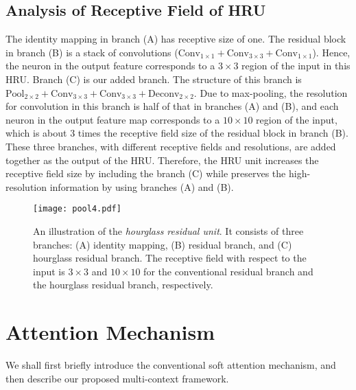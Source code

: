 \documentclass[10pt,twocolumn,letterpaper]{article}
\begin{document}
\subsection{Analysis of Receptive Field of HRU}
The identity mapping in branch (A) has receptive size of one.
The residual block in branch (B) is a stack of convolutions ($\text{Conv}_{1\times1} + \text{Conv}_{3\times3} + \text{Conv}_{1\times1}$).
Hence, the neuron in the output feature corresponds to a $3 \times 3$ region of the input in this HRU. 
Branch (C) is our added branch. The structure of this branch is $\text{Pool}_{2\times 2} + \text{Conv}_{3\times3} + \text{Conv}_{3\times3} + \text{Deconv}_{2\times2}$. 
Due to max-pooling, the resolution for convolution in this branch is half of that in branches (A) and (B), and each neuron in the output feature map corresponds to a $10 \times 10$ region of the input, which is about 3 times the receptive field size of the residual block in branch (B).
These three branches, with different receptive fields and resolutions, are added together as the output of the HRU. 
Therefore, the HRU unit increases the receptive field size by including the branch (C) while preserves the high-resolution information by using branches (A) and (B). 



\begin{figure}[t]
\begin{center}
   \texttt{[image: pool4.pdf]}
\end{center}
  \vspace{-1.5em}
   \caption{\small An illustration of the \textit{hourglass residual unit}. It consists of three branches: (A) identity mapping, (B) residual branch, and (C) hourglass residual branch. The receptive field with respect to the input is $3\times 3$ and $10 \times 10$ for the conventional residual branch and the hourglass residual branch, respectively.}
\label{fig: nested hourglass}
  \vspace{-1em}
\end{figure}




\section{Attention Mechanism}

We shall first briefly introduce the conventional soft attention mechanism, and then describe our proposed multi-context framework. 
\end{document}
